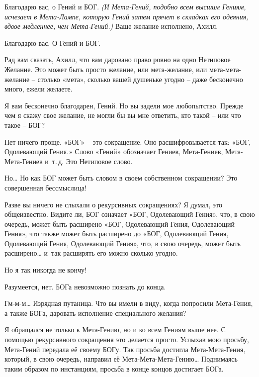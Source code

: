 \documentclass[../main.tex]{subfiles}
\begin{document}
\begin{Dialogue}
\begin{sublevel}
\begin{sublevel}
\begin{sublevel}
\end{sublevel}

 Благодарю вас, о Гений и БОГ\@. \emph{(И Мета-Гений, подобно всем высшим Гениям, исчезает в Мета-Лампе, которую Гений затем прячет в складках его одеяния, вдвое медленнее, чем Мета-Гений.)} Ваше желание исполнено, Ахилл.


 Благодарю вас, О Гений и БОГ\@.

 Рад вам сказать, Ахилл, что вам даровано право ровно на одно Нетиповое Желание. Это может быть просто желание, или мета-желание, или мета-мета-желание \--- столько «мета», сколько вашей душеньке угодно \--- даже бесконечно много, ежели желаете.

 Я вам бесконечно благодарен, Гений. Но вы задели мое любопытство. Прежде чем я скажу свое желание, не могли бы вы мне ответить, кто такой \--- или что такое \--- БОГ?

 Нет ничего проще. «БОГ» \--- это сокращение. Оно расшифровывается так: «БОГ, Одолевающий Гения.» Слово \mbox{«Гений»} обозначает Гениев, Мета-Гениев, Мета-Мета-Гениев и~т.\,д. Это Нетиповое слово.

 Но\ldots{} Но как БОГ может быть словом в своем собственном сокращении? Это совершенная бессмыслица!

 Разве вы ничего не слыхали о рекурсивных сокращениях? Я думал, это общеизвестно. Видите ли, БОГ означает «БОГ, Одолевающий Гения», что, в свою очередь, может быть расширено «БОГ, Одолевающий Гения, Одолевающий Гения», что также может быть расширено до «БОГ, Одолевающий Гения, Одолевающий Гения, Одолевающий Гения», что, в свою очередь, может быть расширено\ldots{} и~так расширять его можно сколько угодно.

 Но я так никогда не кончу!

 Разумеется, нет. БОГа невозможно познать до конца.

 Гм-м-м\ldots{} Изрядная путаница. Что вы имели в виду, когда попросили Мета-Гения, а также БОГа, даровать исполнение специального желания?

 Я обращался не только к Мета-Гению, но и ко всем Гениям выше нее. С помощью рекурсивного сокращения это делается просто. Услыхав мою просьбу, Мета-Гений передала её своему БОГу. Так просьба достигла Мета-Мета-Гения, который, в свою очередь, направил её Мета-Мета-Мета-Гению\ldots{} Поднимаясь таким образом по инстанциям, просьба в конце концов достигает БОГа.


\end{sublevel}
\end{sublevel}
\end{Dialogue}
\end{document}
